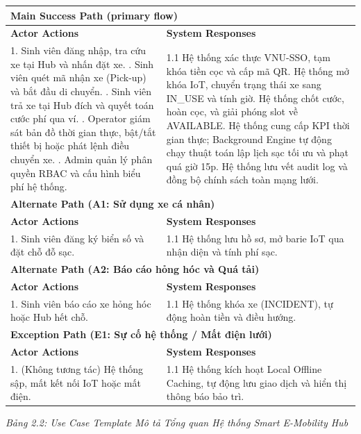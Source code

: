 \documentclass[12pt,a4paper]{report}
\begin{document}
\noindent\begin{tabularx}{\textwidth}{|X|X|}
\hline
\multicolumn{2}{|l|}{\textbf{Main Success Path (primary flow)}} \\
\hline
\textbf{Actor Actions} & \textbf{System Responses} \\
\hline
1. Sinh viên đăng nhập, tra cứu xe tại Hub và nhấn đặt xe. \newline
2. Sinh viên quét mã nhận xe (Pick-up) và bắt đầu di chuyển. \newline
3. Sinh viên trả xe tại Hub đích và quyết toán cước phí qua ví. \newline
4. Operator giám sát bản đồ thời gian thực, bật/tắt thiết bị hoặc phát lệnh điều chuyển xe. \newline
5. Admin quản lý phân quyền RBAC và cấu hình biểu phí hệ thống. & 
1.1 Hệ thống xác thực VNU-SSO, tạm khóa tiền cọc và cấp mã QR. \newline
2.1 Hệ thống mở khóa IoT, chuyển trạng thái xe sang IN\_USE và tính giờ. \newline
3.1 Hệ thống chốt cước, hoàn cọc, và giải phóng slot về AVAILABLE. \newline
4.1 Hệ thống cung cấp KPI thời gian thực; Background Engine tự động chạy thuật toán lập lịch sạc tối ưu và phạt quá giờ 15p. \newline
5.1 Hệ thống lưu vết audit log và đồng bộ chính sách toàn mạng lưới. \\
\hline
\multicolumn{2}{|l|}{\textbf{Alternate Path (A1: Sử dụng xe cá nhân)}} \\
\hline
\textbf{Actor Actions} & \textbf{System Responses} \\
\hline
1. Sinh viên đăng ký biển số và đặt chỗ đỗ sạc. & 1.1 Hệ thống lưu hồ sơ, mở barie IoT qua nhận diện và tính phí sạc. \\
\hline
\multicolumn{2}{|l|}{\textbf{Alternate Path (A2: Báo cáo hỏng hóc và Quá tải)}} \\
\hline
\textbf{Actor Actions} & \textbf{System Responses} \\
\hline
1. Sinh viên báo cáo xe hỏng hóc hoặc Hub hết chỗ. & 1.1 Hệ thống khóa xe (INCIDENT), tự động hoàn tiền và điều hướng. \\
\hline
\multicolumn{2}{|l|}{\textbf{Exception Path (E1: Sự cố hệ thống / Mất điện lưới)}} \\
\hline
\textbf{Actor Actions} & \textbf{System Responses} \\
\hline
1. (Không tương tác) Hệ thống sập, mất kết nối IoT hoặc mất điện. & 1.1 Hệ thống kích hoạt Local Offline Caching, tự động lưu giao dịch và hiển thị thông báo bảo trì. \\
\hline
\end{tabularx}
\begin{center}\textit{Bảng 2.2: Use Case Template Mô tả Tổng quan Hệ thống Smart E-Mobility Hub}\end{center}
\vspace{0.5cm}
\end{document}

